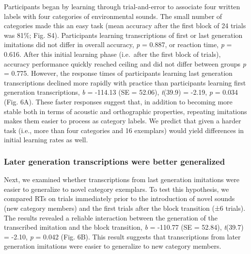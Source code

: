 \documentclass[english,floatsintext,man]{apa6}
\theoremstyle{definition}
\theoremstyle{definition}
\theoremstyle{remark}
\begin{document}
Participants began by learning through trial-and-error to associate four
written labels with four categories of environmental sounds. The small
number of categories made this an easy task (mean accuracy after the
first block of 24 trials was 81\%; Fig. S4). Participants learning
transcriptions of first or last generation imitations did not differ in
overall accuracy, \emph{p} = 0.887, or reaction time, \emph{p} = 0.616.
After this initial learning phase (i.e.~after the first block of
trials), accuracy performance quickly reached ceiling and did not differ
between groups \emph{p} = 0.775. However, the response times of
participants learning last generation transcriptions declined more
rapidly with practice than participants learning first generation
transcriptions, \emph{b} = -114.13 (SE = 52.06), \emph{t}(39.9) = -2.19,
\emph{p} = 0.034 (Fig. 6A). These faster responses suggest that, in
addition to becoming more stable both in terms of acoustic and
orthographic properties, repeating imitations makes them easier to
process as category labels. We predict that given a harder task (i.e.,
more than four categories and 16 exemplars) would yield differences in
initial learning rates as well.

\subsubsection{Later generation transcriptions were better
generalized}\label{later-generation-transcriptions-were-better-generalized}

Next, we examined whether transcriptions from last generation imitations
were easier to generalize to novel category exemplars. To test this
hypothesis, we compared RTs on trials immediately prior to the
introduction of novel sounds (new category members) and the first trials
after the block transition (±6 trials). The results revealed a reliable
interaction between the generation of the transcribed imitation and the
block transition, \emph{b} = -110.77 (SE = 52.84), \emph{t}(39.7) =
-2.10, \emph{p} = 0.042 (Fig. 6B). This result suggests that
transcriptions from later generation imitations were easier to
generalize to new category members.
\end{document}
